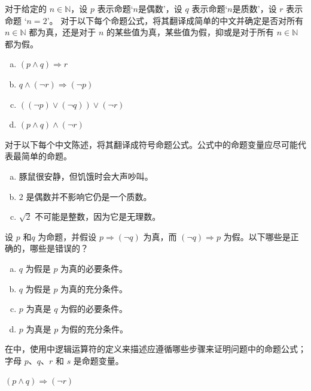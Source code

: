 \begin{chapex}
\label{cqTranslatePropositionalFormulaeToEnglish}
对于给定的 $n \in \mathbb{N}$，设 $p$ 表示命题`$n$是偶数'，设 $q$ 表示命题`$n$是质数'，设 $r$ 表示命题 `$n = 2$'。 对于以下每个命题公式，将其翻译成简单的中文并确定是否对所有 $n \in \mathbb{N}$ 都为真，还是对于 $n$ 的某些值为真，某些值为假，抑或是对于所有 $n \in \mathbb{N}$ 都为假。

\begin{enumerate}[(a)]
\item $(p \wedge q) \Rightarrow r$
\item $q \wedge (\neg r) \Rightarrow (\neg p)$
\item $((\neg p) \vee (\neg q)) \vee (\neg r)$
\item $(p \wedge q) \wedge (\neg r)$
\end{enumerate}
\end{chapex}

\begin{chapex}
对于以下每个中文陈述，将其翻译成符号命题公式。公式中的命题变量应尽可能代表最简单的命题。
\begin{enumerate}[(a)]
\item 豚鼠很安静，但饥饿时会大声吵叫。
\item $2$ 是偶数并不影响它仍是一个质数。
\item $\sqrt{2}$ 不可能是整数，因为它是无理数。
\end{enumerate}
\end{chapex}

\begin{chapex}
设 $p$ 和$q$ 为命题，并假设 $p \Rightarrow (\neg q)$ 为真，而 $(\neg q) \Rightarrow p$ 为假。以下哪些是正确的，哪些是错误的？
\begin{enumerate}[(a)]
\item $q$ 为假是 $p$ 为真的必要条件。
\item $q$ 为假是 $p$ 为真的充分条件。
\item $p$ 为真是 $q$ 为假的必要条件。
\item $p$ 为真是 $p$ 为假的充分条件。
\end{enumerate}
\end{chapex}

在中，使用中逻辑运算符的定义来描述应遵循哪些步骤来证明问题中的命题公式；字母 $p$、$q$、$r$ 和 $s$ 是命题变量。

\begin{chapex}
\label{cqStructureProofBegin}
$(p \wedge q) \Rightarrow (\neg r)$
\end{chapex}

